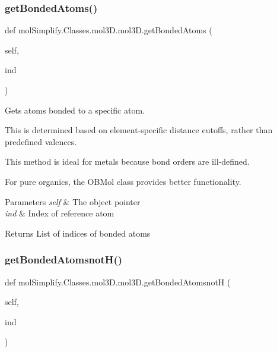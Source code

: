 \subsubsection{\texorpdfstring{get\+Bonded\+Atoms()}{getBondedAtoms()}}
{\footnotesize\ttfamily def mol\+Simplify.\+Classes.\+mol3\+D.\+mol3\+D.\+get\+Bonded\+Atoms (\begin{DoxyParamCaption}\item[{}]{self,  }\item[{}]{ind }\end{DoxyParamCaption})}



Gets atoms bonded to a specific atom. 

This is determined based on element-\/specific distance cutoffs, rather than predefined valences.

This method is ideal for metals because bond orders are ill-\/defined.

For pure organics, the O\+B\+Mol class provides better functionality. 
\begin{DoxyParams}{Parameters}
{\em self} & The object pointer \\
\hline
{\em ind} & Index of reference atom \\
\hline
\end{DoxyParams}
\begin{DoxyReturn}{Returns}
List of indices of bonded atoms 
\end{DoxyReturn}
\mbox{\label{classmolSimplify_1_1Classes_1_1mol3D_1_1mol3D_acda82e48cde5996f32a55e0acbdf052e}} 
\subsubsection{\texorpdfstring{get\+Bonded\+Atomsnot\+H()}{getBondedAtomsnotH()}}
{\footnotesize\ttfamily def mol\+Simplify.\+Classes.\+mol3\+D.\+mol3\+D.\+get\+Bonded\+AtomsnotH (\begin{DoxyParamCaption}\item[{}]{self,  }\item[{}]{ind }\end{DoxyParamCaption})}



